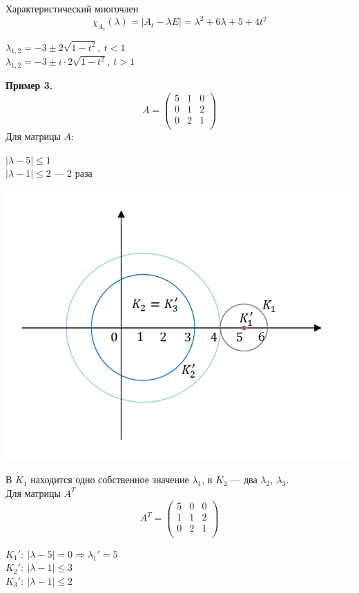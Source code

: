 \documentclass[12pt]{article}
\theoremstyle{definition}
\numberwithin{equation}{section}
\begin{document}
Характеристический многочлен $$\chi_{A_t}(\lambda)=|A_t-\lambda E|=\lambda^2+6\lambda+5+4t^2$$
\begin{center}
$\lambda_{1,2}=-3\pm 2\sqrt{1-t^2},~t<1$\\
$\lambda_{1,2}=-3\pm i\cdot 2\sqrt{1-t^2},~t>1$
\end{center}
\textbf{Пример 3.}\\
\[A=\begin{pmatrix}
5 & 1 & 0 \\
0 & 1 & 2 \\
0 & 2 & 1 \\
\end{pmatrix}\]
Для матрицы $A$:
\begin{center}
$|\lambda-5|\leqslant 1$\\
$|\lambda-1|\leqslant 2$ --- 2 раза
\end{center}
\begin{center}
\includegraphics[scale=0.8]{l9_6.png}
\end{center}
В $K_1$ находится одно собственное значение $\lambda_1$, в $K_2$ --- два $\lambda_2,~\lambda_3$.\\
Для матрицы $A^T$
\[A^T=\begin{pmatrix}
5 & 0 & 0 \\
1 & 1 & 2 \\
0 & 2 & 1 \\
\end{pmatrix}\]
\begin{center}
$K_1':~|\lambda-5|=0 \Rightarrow \lambda_1'=5$\\
$K_2':~|\lambda-1|\leqslant 3$\\
$K_3':~|\lambda-1|\leqslant 2$
\end{center}
\end{document}
